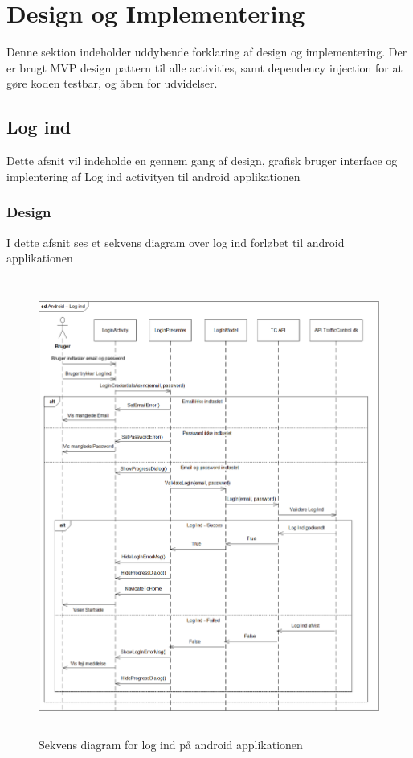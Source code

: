 \section{Design og Implementering}
	Denne sektion indeholder uddybende forklaring af design og implementering.
	Der er brugt MVP design pattern til alle activities, samt dependency injection for at gøre koden testbar, og åben for udvidelser.
	
	\subsection{Log ind}
	Dette afsnit vil indeholde en gennem gang af design, grafisk bruger interface og implentering af Log ind activityen til android applikationen
	\subsubsection{Design}
	I dette afsnit ses et sekvens diagram over log ind forløbet til android applikationen
	\begin{figure} [!ht]
		\begin{center}
			\includegraphics[height=15cm]{Android/Billeder/SekvensDiagramLogInd}
		\end{center}
		\caption{Sekvens diagram for log ind på android applikationen}
		\label{fig:Sekvens diagram for Log Ind Android}
	\end{figure}
	\pagebreak
	
